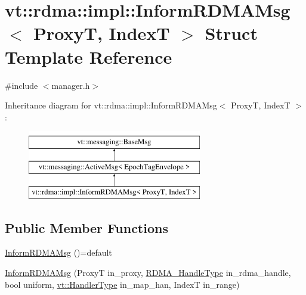 \hypertarget{structvt_1_1rdma_1_1impl_1_1_inform_r_d_m_a_msg}{}\section{vt\+:\+:rdma\+:\+:impl\+:\+:Inform\+R\+D\+M\+A\+Msg$<$ ProxyT, IndexT $>$ Struct Template Reference}
\label{structvt_1_1rdma_1_1impl_1_1_inform_r_d_m_a_msg}


{\ttfamily \#include $<$manager.\+h$>$}

Inheritance diagram for vt\+:\+:rdma\+:\+:impl\+:\+:Inform\+R\+D\+M\+A\+Msg$<$ ProxyT, IndexT $>$\+:\begin{figure}[H]
\begin{center}
\leavevmode
\includegraphics[height=3.000000cm]{structvt_1_1rdma_1_1impl_1_1_inform_r_d_m_a_msg}
\end{center}
\end{figure}
\subsection*{Public Member Functions}
\begin{DoxyCompactItemize}
\item 
\hyperlink{structvt_1_1rdma_1_1impl_1_1_inform_r_d_m_a_msg_a551aa10ed9bed0f5c719875462de7ea5}{Inform\+R\+D\+M\+A\+Msg} ()=default
\item 
\hyperlink{structvt_1_1rdma_1_1impl_1_1_inform_r_d_m_a_msg_ad7c38cd2d3d7c1a4e82a78c0335d8722}{Inform\+R\+D\+M\+A\+Msg} (ProxyT in\+\_\+proxy, \hyperlink{namespacevt_a10442579ec4e7ebef223818e64bcf908}{R\+D\+M\+A\+\_\+\+Handle\+Type} in\+\_\+rdma\+\_\+handle, bool uniform, \hyperlink{namespacevt_af64846b57dfcaf104da3ef6967917573}{vt\+::\+Handler\+Type} in\+\_\+map\+\_\+han, IndexT in\+\_\+range)
\end{DoxyCompactItemize}
